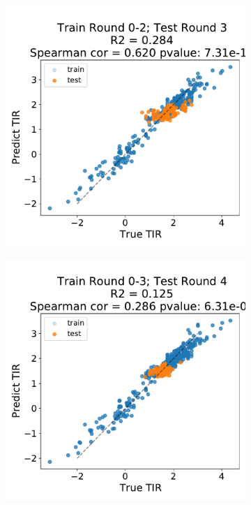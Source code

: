 \documentclass{scrartcl}[2013/05/29]%
\begin{document}
\begin{figure}[!ht]
\begin{subfigure}[b]{0.49\textwidth}
    \end{subfigure}
    \begin{subfigure}[b]{0.49\textwidth}
        \centering
        \caption{}
        \includegraphics[scale=0.4]{plots/Supplementary/scatter_abc1_FF_2_salis.pdf}
    \end{subfigure}
    \begin{subfigure}[b]{0.49\textwidth}
        \centering
        \caption{}
        \includegraphics[scale=0.4]{plots/Supplementary/scatter_abc1_FF_3_salis.pdf}

\end{subfigure}
\end{figure}
\end{document}
